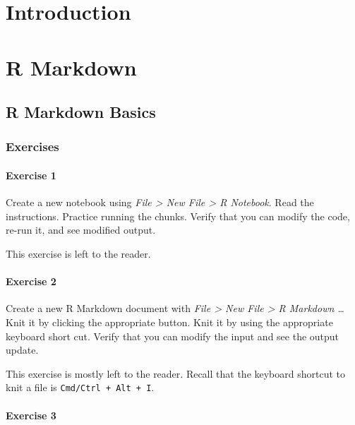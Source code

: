 \documentclass[]{book}
\theoremstyle{plain}
\theoremstyle{remark}
\theoremstyle{definition}
\theoremstyle{definition}
\theoremstyle{definition}
\theoremstyle{remark}
\begin{document}
\hypertarget{communicate-intro}{%
\chapter{Introduction}\label{communicate-intro}}

\hypertarget{r-markdown}{%
\chapter{R Markdown}\label{r-markdown}}

\hypertarget{r-markdown-basics}{%
\section{R Markdown Basics}\label{r-markdown-basics}}

\hypertarget{exercises-6}{%
\subsection{Exercises}\label{exercises-6}}

\hypertarget{exercise-1-70}{%
\subsubsection{Exercise 1}\label{exercise-1-70}}

Create a new notebook using \emph{File \textgreater{} New File
\textgreater{} R Notebook}. Read the instructions. Practice running the
chunks. Verify that you can modify the code, re-run it, and see modified
output.

This exercise is left to the reader.

\hypertarget{exercise-2-68}{%
\subsubsection{Exercise 2}\label{exercise-2-68}}

Create a new R Markdown document with \emph{File \textgreater{} New File
\textgreater{} R Markdown \ldots{}} Knit it by clicking the appropriate
button. Knit it by using the appropriate keyboard short cut. Verify that
you can modify the input and see the output update.

This exercise is mostly left to the reader. Recall that the keyboard
shortcut to knit a file is \texttt{Cmd/Ctrl\ +\ Alt\ +\ I}.

\hypertarget{exercise-3-54}{%
\subsubsection{Exercise 3}\label{exercise-3-54}}
\end{document}
